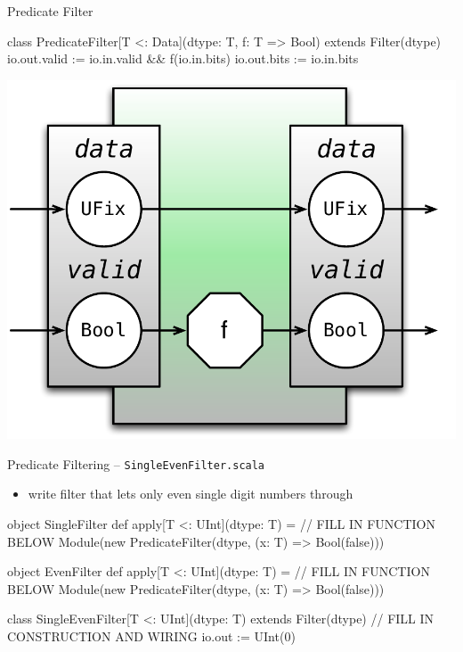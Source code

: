 \documentclass[xcolor=pdflatex,dvipsnames,table]{beamer}
\begin{document}
\begin{frame}[fragile]{Predicate Filter}
\begin{scala}
class PredicateFilter[T <: Data](dtype: T, f: T => Bool) 
    extends Filter(dtype) {
  io.out.valid := io.in.valid && f(io.in.bits)
  io.out.bits  := io.in.bits
}
\end{scala}

\begin{center}
\includegraphics[height=0.4\textheight]{figs/predicate-filter.pdf} 
\end{center}
\end{frame}

\begin{frame}[fragile]{Predicate Filtering -- \tt SingleEvenFilter.scala}
\begin{itemize}
\item write filter that lets only even single digit numbers through
\end{itemize}
\begin{scala}
object SingleFilter {
  def apply[T <: UInt](dtype: T) = // FILL IN FUNCTION BELOW
    Module(new PredicateFilter(dtype, (x: T) => Bool(false)))
}

object EvenFilter {
  def apply[T <: UInt](dtype: T) = // FILL IN FUNCTION BELOW
    Module(new PredicateFilter(dtype, (x: T) => Bool(false)))
}

class SingleEvenFilter[T <: UInt](dtype: T) extends Filter(dtype) {
  // FILL IN CONSTRUCTION AND WIRING
  io.out := UInt(0)
}
\end{scala}
\end{frame}
\end{document}
